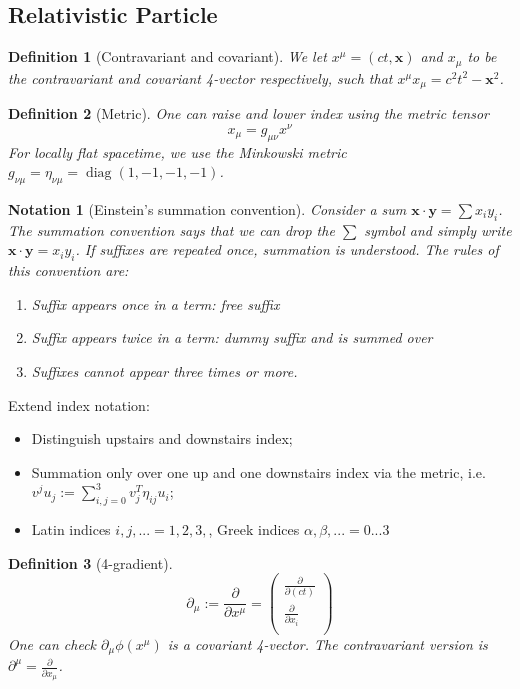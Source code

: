 \documentclass[a4paper]{article}
\DeclareMathOperator{\diag}{diag}
\newtheorem{notation}{Notation}[section]
\theoremstyle{new}
\newtheorem{defi}{Definition}[section]
\begin{document}
\subsection{Relativistic Particle}
\begin{defi}[Contravariant and covariant]
We let $x^\mu=(ct,\mathbf{x})$ and $x_\mu$ to be the contravariant and covariant 4-vector respectively, such that $x^\mu x_\mu=c^2t^2-\mathbf{x}^2$.  
\end{defi}
\begin{defi}[Metric]
One can raise and lower index using the metric tensor
$$x_\mu=g_{\mu\nu}x^\nu$$
For locally flat spacetime, we use the Minkowski metric $g_{\nu\mu}=\eta_{\nu\mu}=\diag(1,-1,-1,-1)$.
\end{defi}
\begin{notation}[Einstein's summation convention]
  Consider a sum $\mathbf{x}\cdot \mathbf{y} = \sum x_i y_i$. The summation convention says that we can drop the $\sum$ symbol and simply write $\mathbf{x}\cdot \mathbf{y} = x_i y_i$. If suffixes are repeated once, summation is understood. The rules of this convention are:
  \begin{enumerate}
    \item Suffix appears once in a term: free suffix
    \item Suffix appears twice in a term: dummy suffix and is summed over
    \item Suffixes cannot appear three times or more.
  \end{enumerate}
\end{notation}
Extend index notation:
\begin{itemize}
    \item Distinguish upstairs and downstairs index;
    \item Summation only over one up and one downstairs index via the metric, i.e. $v^ju_j:=\sum_{i,j=0}^3v_j^T\eta_{ij}u_i$;
    \item Latin indices $i,j,...=1,2,3,$, Greek indices $\alpha,\beta,...=0...3$
\end{itemize}
\begin{defi}[4-gradient]
$$\partial_\mu:=\frac{\partial}{\partial x^\mu}=\begin{pmatrix}\frac{\partial}{\partial(ct)}\\\frac{\partial}{\partial x_i}\\\end{pmatrix}$$
One can check $\partial_\mu\phi(x^\mu)$ is a covariant 4-vector. The contravariant version is $\partial^\mu=\frac{\partial}{\partial x_\mu}$.
\end{defi}
\end{document}
